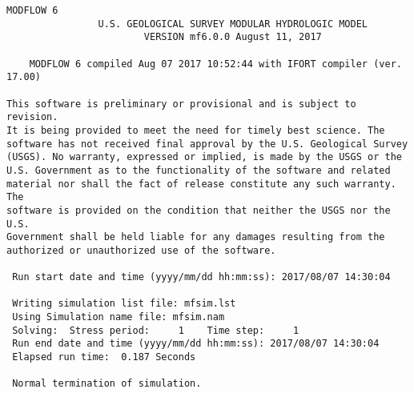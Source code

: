 {\small
\begin{lstlisting}[style=modeloutput]
                                   MODFLOW 6
                U.S. GEOLOGICAL SURVEY MODULAR HYDROLOGIC MODEL
                        VERSION mf6.0.0 August 11, 2017

    MODFLOW 6 compiled Aug 07 2017 10:52:44 with IFORT compiler (ver. 17.00)

This software is preliminary or provisional and is subject to revision.
It is being provided to meet the need for timely best science. The
software has not received final approval by the U.S. Geological Survey
(USGS). No warranty, expressed or implied, is made by the USGS or the
U.S. Government as to the functionality of the software and related
material nor shall the fact of release constitute any such warranty. The
software is provided on the condition that neither the USGS nor the U.S.
Government shall be held liable for any damages resulting from the
authorized or unauthorized use of the software.

 Run start date and time (yyyy/mm/dd hh:mm:ss): 2017/08/07 14:30:04

 Writing simulation list file: mfsim.lst
 Using Simulation name file: mfsim.nam
 Solving:  Stress period:     1    Time step:     1
 Run end date and time (yyyy/mm/dd hh:mm:ss): 2017/08/07 14:30:04
 Elapsed run time:  0.187 Seconds

 Normal termination of simulation.
\end{lstlisting}
}
